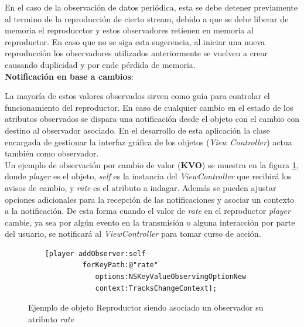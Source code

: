 En el caso de la observación de datos periódica, esta se debe detener previamente al termino de la reproducción de cierto stream, debido a que se debe liberar de memoria el reproducctor y estos observadores retienen en memoria al reproductor. En caso que no se siga esta sugerencia, al iniciar una nueva reproducción los observadores utilizados anteriormente se vuelven a crear causando duplicidad y por ende pérdida de memoria.\\


\textbf{Notificación en base a cambios}:

La mayoría de estos valores observados sirven como guía para controlar el funcionamiento del reproductor. En caso de cualquier cambio en el estado de los atributos observados se dispara una notificación desde el objeto con el cambio con destino al observador asociado. 
En el desarrollo de esta aplicación la clase encargada de gestionar la interfaz gráfica de los objetos (\textit{View Controller}) actua también como observador.\\

Un ejemplo de observación por cambio de valor (\textbf{KVO}) se muestra en la figura \ref{exampleCodeObserver}, donde \textit{player} es el objeto, \textit{self} es la instancia del \textit{ViewController} que recibirá los avisos de cambio, y \textit{rate} es el atributo a indagar. Además se pueden ajustar opciones adicionales para la recepción de las notificaciones y asociar un contexto a la notificación. De esta forma cuando el valor de \textit{rate} en el reproductor \textit{player} cambie, ya sea por algún evento en la transmisión o alguna interacción por parte del usuario, se notificará al \textit{ViewController} para tomar curso de acción.
\begin{figure}[H]
	\centering
	\begin{lstlisting}
	[player addObserver:self  
			 forKeyPath:@"rate"
		        options:NSKeyValueObservingOptionNew
		        context:TracksChangeContext];
	\end{lstlisting}
	\caption{Ejemplo de objeto Reproductor siendo asociado un observador su atributo \textit{rate}}
	\label{exampleCodeObserver}	
\end{figure}	
 
